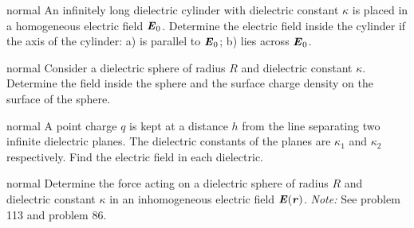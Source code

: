 \hypertarget{P112}{}
\begin{solution}{normal} %
An infinitely long dielectric cylinder with dielectric constant $\kappa$ is placed in a homogeneous electric field $\textbf{\textit{E}}_0$. Determine the electric field inside the cylinder if the axis of the cylinder: a) is parallel to $\textbf{\textit{E}}_0$; b) lies across $\textbf{\textit{E}}_0$.
\end{solution}

\hypertarget{P113}{}
\begin{solution}{normal} %
Consider a dielectric sphere of radius $R$ and dielectric constant $\kappa$. Determine the field inside the sphere and the surface charge density on the surface of the sphere.
\end{solution}

\hypertarget{P114}{}
\begin{solution}{normal} %
A point charge $q$ is kept at a distance $h$ from the line separating two infinite dielectric planes. The dielectric constants of the planes are $\kappa_1$ and $\kappa_2$ respectively. Find the electric field in each dielectric.
\end{solution}

\hypertarget{P115}{}
\begin{solution}{normal} %
Determine the force acting on a dielectric sphere of radius $R$ and dielectric constant $\kappa$ in an inhomogeneous electric field $\textbf{\textit{E}}(\textbf{\textit{r}})$. \textit{Note:} See problem 113 and problem 86.
\end{solution}